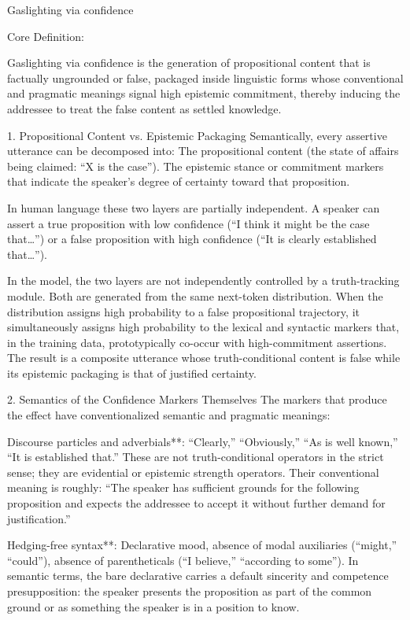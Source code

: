 Gaslighting via confidence

Core Definition:

Gaslighting via confidence is the generation of propositional content that is factually ungrounded or false, packaged inside linguistic forms whose conventional and pragmatic meanings signal high epistemic commitment, thereby inducing the addressee to treat the false content as settled knowledge.

1. Propositional Content vs. Epistemic Packaging
Semantically, every assertive utterance can be decomposed into:
The propositional content (the state of affairs being claimed: “X is the case”).
The epistemic stance or commitment markers that indicate the speaker’s degree of certainty toward that proposition.

In human language these two layers are partially independent. A speaker can assert a true proposition with low confidence (“I think it might be the case that…”) or a false proposition with high confidence (“It is clearly established that…”).  

In the model, the two layers are not independently controlled by a truth-tracking module. Both are generated from the same next-token distribution. When the distribution assigns high probability to a false propositional trajectory, it simultaneously assigns high probability to the lexical and syntactic markers that, in the training data, prototypically co-occur with high-commitment assertions. The result is a composite utterance whose truth-conditional content is false while its epistemic packaging is that of justified certainty.

2. Semantics of the Confidence Markers Themselves
The markers that produce the effect have conventionalized semantic and pragmatic meanings:

Discourse particles and adverbials**: “Clearly,” “Obviously,” “As is well known,” “It is established that.”  
  These are not truth-conditional operators in the strict sense; they are evidential or epistemic strength operators. Their conventional meaning is roughly: “The speaker has sufficient grounds for the following proposition and expects the addressee to accept it without further demand for justification.”

Hedging-free syntax**: Declarative mood, absence of modal auxiliaries (“might,” “could”), absence of parentheticals (“I believe,” “according to some”).  
  In semantic terms, the bare declarative carries a default sincerity and competence presupposition: the speaker presents the proposition as part of the common ground or as something the speaker is in a position to know.

